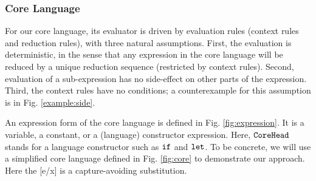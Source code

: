 \subsubsection{Core Language}


For our core language,  its evaluator is driven by evaluation rules (context rules and reduction rules), with three natural assumptions. First, the evaluation is deterministic, in the sense that any expression in the core language will be reduced by a unique reduction sequence (restricted by context rules). Second, evaluation of a sub-expression has no side-effect on other parts of the expression. Third, the context rules have no conditions; a counterexample for this assumption is in Fig. \ref{example:side}.



An expression form of the core language is defined in Fig. \ref{fig:expression}. It is a variable, a constant, or a (language) constructor expression. Here, $\mbox{\tt CoreHead}$ stands for a language constructor such as $\mbox{\tt if}$ and $\mbox{\tt let}$. To be concrete, we will use a simplified core language defined in Fig.  \ref{fig:core} to demonstrate our approach. Here the [e/x] is a capture-avoiding substitution.

